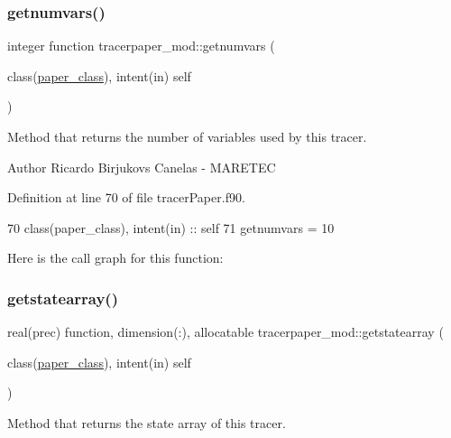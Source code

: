 \subsubsection{\texorpdfstring{getnumvars()}{getnumvars()}}
{\footnotesize\ttfamily integer function tracerpaper\+\_\+mod\+::getnumvars (\begin{DoxyParamCaption}\item[{class(\mbox{\hyperlink{structtracerpaper__mod_1_1paper__class}{paper\+\_\+class}}), intent(in)}]{self }\end{DoxyParamCaption})\hspace{0.3cm}{\ttfamily [private]}}



Method that returns the number of variables used by this tracer. 

\begin{DoxyAuthor}{Author}
Ricardo Birjukovs Canelas -\/ M\+A\+R\+E\+T\+EC 
\end{DoxyAuthor}


Definition at line 70 of file tracer\+Paper.\+f90.


\begin{DoxyCode}
70     \textcolor{keywordtype}{class}(paper\_class), \textcolor{keywordtype}{intent(in)} :: self
71     getnumvars = 10
\end{DoxyCode}
Here is the call graph for this function\+:
\mbox{\label{namespacetracerpaper__mod_a703693333469e5091ec8de0a62171294}} 
\subsubsection{\texorpdfstring{getstatearray()}{getstatearray()}}
{\footnotesize\ttfamily real(prec) function, dimension(\+:), allocatable tracerpaper\+\_\+mod\+::getstatearray (\begin{DoxyParamCaption}\item[{class(\mbox{\hyperlink{structtracerpaper__mod_1_1paper__class}{paper\+\_\+class}}), intent(in)}]{self }\end{DoxyParamCaption})\hspace{0.3cm}{\ttfamily [private]}}



Method that returns the state array of this tracer. 

